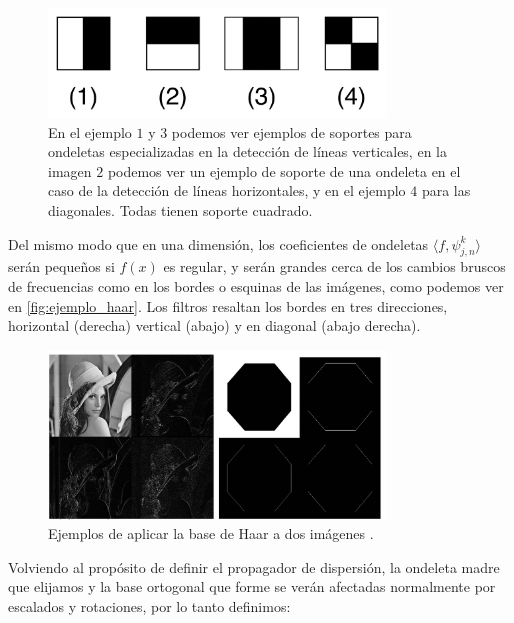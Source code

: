 \begin{figure} [!h]
  \centering
  \includegraphics[width=0.8\textwidth]{img/base_haar_2d.png}
  \caption{En el ejemplo $1$ y $3$ podemos ver ejemplos de soportes para ondeletas especializadas en la detección de líneas verticales, en la imagen $2$ podemos ver un ejemplo de soporte de una ondeleta en el caso de la detección de líneas horizontales, y en el ejemplo $4$ para las diagonales. Todas tienen soporte cuadrado.}
  \label{fig:base_haar}
\end{figure}

\noindent Del mismo modo que en una dimensión, los coeficientes de ondeletas $\langle f,\psi_{j,n}^k \rangle$ serán pequeños si $f(x)$ es regular, y serán grandes cerca de los cambios bruscos de frecuencias como en los bordes o esquinas de las imágenes, como podemos ver en \autoref{fig:ejemplo_haar}. Los filtros resaltan los bordes en tres direcciones, horizontal (derecha) vertical (abajo) y en diagonal (abajo derecha).

\begin{figure} [!h]
  \centering
  \includegraphics[width=0.8\textwidth]{img/ejemplos_haar_basis.png}
  \caption{Ejemplos de aplicar la base de Haar a dos imágenes \cite{HaarBasis}.}
  \label{fig:ejemplo_haar}
\end{figure}

\medskip 

\noindent Volviendo al propósito de definir el propagador de dispersión, la ondeleta madre que elijamos y la base ortogonal que forme se verán afectadas normalmente por escalados y rotaciones, por lo tanto definimos: 

